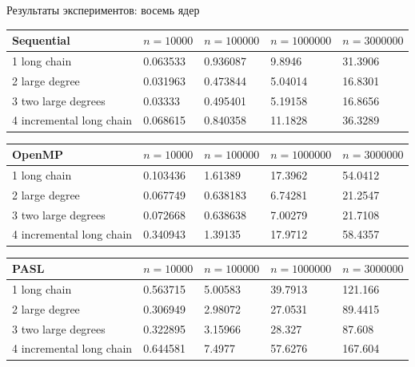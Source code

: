 \documentclass[hyperref=unicode,graphics=pdflatex,13pt]{beamer}
\begin{document}
\begin{frame}[shrink]{Результаты экспериментов: восемь ядер}

\begin{table}[!ht]
\centering
\begin{tabular}{|l|l|l|l|l|}\hline
Sequential	& $n=10000$ & $n=100000$ & $n=1000000$ & $n=3000000$ \\\hline
1 long chain & 0.063533	& 0.936087 & 9.8946 & 31.3906 \\\hline
2 large degree & 0.031963 & 0.473844 & 5.04014 & 16.8301 \\\hline
3 two large degrees & 0.03333 & 0.495401 & 5.19158 & 16.8656 \\\hline
4 incremental long chain & 0.068615 & 0.840358 & 11.1828 & 36.3289 \\\hline
\end{tabular}
\end{table}

\begin{table}[!ht]
\centering
\begin{tabular}{|l|l|l|l|l|}\hline
OpenMP	& $n=10000$ & $n=100000$ & $n=1000000$ & $n=3000000$ \\\hline
1 long chain & 0.103436 & 1.61389 & 17.3962 & 54.0412 \\\hline
2 large degree & 0.067749 & 0.638183 & 6.74281 & 21.2547 \\\hline
3 two large degrees & 0.072668 & 0.638638 & 7.00279 & 21.7108 \\\hline
4 incremental long chain & 0.340943 & 1.39135 &	17.9712 & 58.4357 \\\hline
\end{tabular}
\end{table}

\begin{table}[!ht]
\centering
\begin{tabular}{|l|l|l|l|l|}\hline
PASL	& $n=10000$ & $n=100000$ & $n=1000000$ & $n=3000000$ \\\hline
1 long chain & 0.563715	& 5.00583 & 39.7913 & 121.166 \\\hline
2 large degree & 0.306949 & 2.98072 & 27.0531 & 89.4415 \\\hline
3 two large degrees & 0.322895 & 3.15966 & 28.327 & 87.608 \\\hline
4 incremental long chain & 0.644581 & 7.4977 & 57.6276 & 167.604 \\\hline
\end{tabular}
\end{table}
\end{frame}
\end{document}

